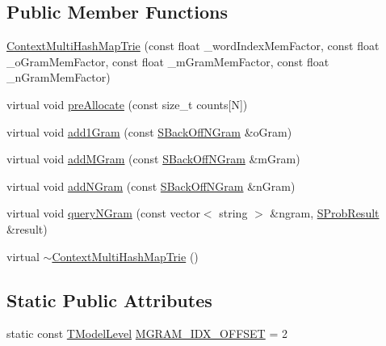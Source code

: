 \subsection*{Public Member Functions}
\begin{DoxyCompactItemize}
\item 
\hyperlink{classuva_1_1smt_1_1tries_1_1_context_multi_hash_map_trie_a4dedd355285be9d410d0cef0faf4e493}{Context\+Multi\+Hash\+Map\+Trie} (const float \+\_\+word\+Index\+Mem\+Factor, const float \+\_\+o\+Gram\+Mem\+Factor, const float \+\_\+m\+Gram\+Mem\+Factor, const float \+\_\+n\+Gram\+Mem\+Factor)
\item 
virtual void \hyperlink{classuva_1_1smt_1_1tries_1_1_context_multi_hash_map_trie_ac744e6f6e63317d1f955ac96d504f724}{pre\+Allocate} (const size\+\_\+t counts\mbox{[}N\mbox{]})
\item 
virtual void \hyperlink{classuva_1_1smt_1_1tries_1_1_context_multi_hash_map_trie_abc5ad6e7f2a260a4cc374bbc332edc5c}{add1\+Gram} (const \hyperlink{structuva_1_1smt_1_1tries_1_1_s_back_off_n_gram}{S\+Back\+Off\+N\+Gram} \&o\+Gram)
\item 
virtual void \hyperlink{classuva_1_1smt_1_1tries_1_1_context_multi_hash_map_trie_adaf0ff4116ea8c9c0ffe7407841bf8e1}{add\+M\+Gram} (const \hyperlink{structuva_1_1smt_1_1tries_1_1_s_back_off_n_gram}{S\+Back\+Off\+N\+Gram} \&m\+Gram)
\item 
virtual void \hyperlink{classuva_1_1smt_1_1tries_1_1_context_multi_hash_map_trie_a2d8c22fa039d475b8b39f06531b58bc7}{add\+N\+Gram} (const \hyperlink{structuva_1_1smt_1_1tries_1_1_s_back_off_n_gram}{S\+Back\+Off\+N\+Gram} \&n\+Gram)
\item 
virtual void \hyperlink{classuva_1_1smt_1_1tries_1_1_context_multi_hash_map_trie_ad861e3027580ea2b78c95b22c43395ee}{query\+N\+Gram} (const vector$<$ string $>$ \&ngram, \hyperlink{structuva_1_1smt_1_1tries_1_1_s_prob_result}{S\+Prob\+Result} \&result)
\item 
virtual \hyperlink{classuva_1_1smt_1_1tries_1_1_context_multi_hash_map_trie_ad3a1ce51fea9d2c2d6aaf4f2f0dded85}{$\sim$\+Context\+Multi\+Hash\+Map\+Trie} ()
\end{DoxyCompactItemize}
\subsection*{Static Public Attributes}
\begin{DoxyCompactItemize}
\item 
static const \hyperlink{namespaceuva_1_1smt_1_1tries_a26064146e98856c7c4185efab0e61a36}{T\+Model\+Level} \hyperlink{classuva_1_1smt_1_1tries_1_1_context_multi_hash_map_trie_ab12bd7cfd0b00da7c134d8d6b1694346}{M\+G\+R\+A\+M\+\_\+\+I\+D\+X\+\_\+\+O\+F\+F\+S\+E\+T} = 2
\end{DoxyCompactItemize}
